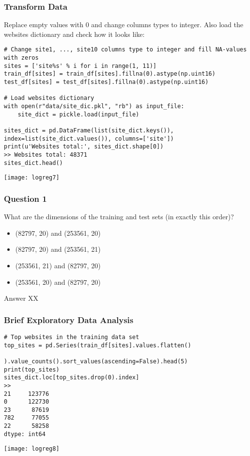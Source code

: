 \begin{frame}[fragile]\frametitle{Transform Data}	
Replace empty values with 0 and change columns types to integer. Also load the websites dictionary and check how it looks like:
\begin{lstlisting}
# Change site1, ..., site10 columns type to integer and fill NA-values with zeros
sites = ['site%s' % i for i in range(1, 11)]
train_df[sites] = train_df[sites].fillna(0).astype(np.uint16)
test_df[sites] = test_df[sites].fillna(0).astype(np.uint16)

# Load websites dictionary
with open(r"data/site_dic.pkl", "rb") as input_file:
    site_dict = pickle.load(input_file)

sites_dict = pd.DataFrame(list(site_dict.keys()), index=list(site_dict.values()), columns=['site'])
print(u'Websites total:', sites_dict.shape[0])
>> Websites total: 48371
sites_dict.head()
\end{lstlisting}
\begin{center}
\texttt{[image: logreg7]}
\end{center}
\end{frame}

\begin{frame}[fragile]\frametitle{Question 1}
What are the dimensions of the training and test sets (in exactly this order)?
\begin{itemize}
\item (82797, 20) and (253561, 20)
\item (82797, 20) and (253561, 21)
\item (253561, 21) and (82797, 20)
\item (253561, 20) and (82797, 20)
\end{itemize}
Answer XX
\end{frame}

\begin{frame}[fragile]\frametitle{Brief Exploratory Data Analysis}	
\begin{lstlisting}
# Top websites in the training data set
top_sites = pd.Series(train_df[sites].values.flatten()
                     ).value_counts().sort_values(ascending=False).head(5)
print(top_sites)
sites_dict.loc[top_sites.drop(0).index]
>>
21     123776
0      122730
23      87619
782     77055
22      58258
dtype: int64
\end{lstlisting}
\begin{center}
\texttt{[image: logreg8]}
\end{center}
\end{frame}

